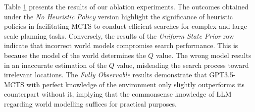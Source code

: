 \begin{table}[h]
\begin{tabular}{@{}ccccccccc@{}}
\\ \bottomrule
\end{tabular}
\label{tab:ablation}
\vspace{-8pt}
\end{table}

Table \ref{tab:ablation} presents the results of our ablation experiments. The outcomes obtained under the \textit{No Heuristic Policy} version highlight the significance of heuristic policies in facilitating MCTS to conduct efficient searches for complex and large-scale planning tasks. Conversely, the results of the \textit{Uniform State Prior} row indicate that incorrect world models compromise search performance. This is because the model of the world determines the $Q$ value. The wrong model results in an inaccurate estimation of the $Q$ value, misleading the search process toward irrelevant locations. The \textit{Fully Observable} results demonstrate that GPT3.5-MCTS with perfect knowledge of the environment only slightly outperforms its counterpart without it, implying that the commonsense knowledge of LLM regarding world modelling suffices for practical purposes.



